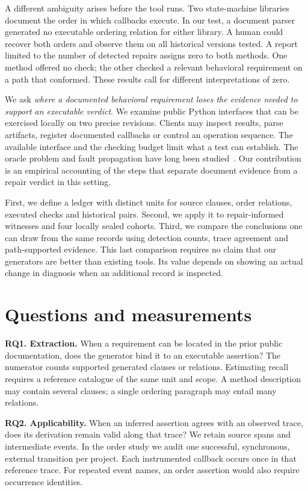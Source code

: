 \documentclass[conference]{IEEEtran}
\begin{document}
A different ambiguity arises before the tool runs. Two state-machine libraries document the order in which callbacks execute. In our test, a document parser generated no executable ordering relation for either library. A human could recover both orders and observe them on all historical versions tested. A report limited to the number of detected repairs assigns zero to both methods. One method offered no check; the other checked a relevant behavioral requirement on a path that conformed. These results call for different interpretations of zero.

We ask \emph{where a documented behavioral requirement loses the evidence needed to support an executable verdict}. We examine public Python interfaces that can be exercised locally on two precise revisions. Clients may inspect results, parse artifacts, register documented callbacks or control an operation sequence. The available interface and the checking budget limit what a test can establish. The oracle problem and fault propagation have long been studied~\cite{barr,ripr}. Our contribution is an empirical accounting of the steps that separate document evidence from a repair verdict in this setting.

First, we define a ledger with distinct units for source clauses, order relations, executed checks and historical pairs. Second, we apply it to repair-informed witnesses and four locally sealed cohorts. Third, we compare the conclusions one can draw from the same records using detection counts, trace agreement and path-supported evidence. This last comparison requires no claim that our generators are better than existing tools. Its value depends on showing an actual change in diagnosis when an additional record is inspected.

\section{Questions and measurements}
\textbf{RQ1. Extraction.} When a requirement can be located in the prior public documentation, does the generator bind it to an executable assertion? The numerator counts supported generated clauses or relations. Estimating recall requires a reference catalogue of the same unit and scope. A method description may contain several clauses; a single ordering paragraph may entail many relations.

\textbf{RQ2. Applicability.} When an inferred assertion agrees with an observed trace, does its derivation remain valid along that trace? We retain source spans and intermediate events. In the order study we audit one successful, synchronous, external transition per project. Each instrumented callback occurs once in that reference trace. For repeated event names, an order assertion would also require occurrence identities.
\end{document}
